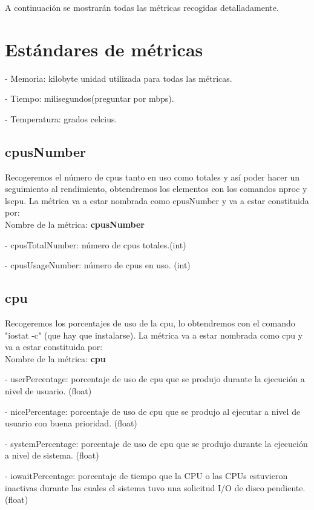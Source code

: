 \documentclass[ spanish, a4paper, 12pt, oneside]{report}
\begin{document}
A continuación se mostrarán todas las métricas recogidas detalladamente.\\

\section{Estándares de métricas}

\hyp{} Memoria: kilobyte unidad utilizada para todas las métricas.

\hyp{} Tiempo: milisegundos(preguntar por mbps).

\hyp{} Temperatura: grados celcius.

\subsection{cpusNumber}
Recogeremos el número de cpus tanto en uso como totales y así poder hacer un seguimiento al rendimiento, obtendremos los elementos con 
los comandos nproc y lscpu. La métrica va a estar nombrada como cpusNumber y va a estar constituida por:\\

Nombre de la métrica: \textbf{cpusNumber}

\hyp{} cpusTotalNumber: número de cpus totales.(int)

\hyp{} cpusUsageNumber: número de cpus en uso. (int)

\subsection{cpu}
Recogeremos los porcentajes de uso de la cpu, lo obtendremos con el comando "iostat -c" (que hay que instalarse). 
La métrica va a estar nombrada como cpu y va a estar constituida por:\\

Nombre de la métrica: \textbf{cpu}

\hyp{} userPercentage: porcentaje de uso de cpu que se produjo durante la ejecución a nivel de usuario. (float)

\hyp{} nicePercentage: porcentaje de uso de cpu que se produjo al ejecutar a nivel de usuario con buena prioridad. (float)

\hyp{} systemPercentage: porcentaje de uso de cpu que se produjo durante la ejecución a nivel de sistema. (float) 

\hyp{} iowaitPercentage: porcentaje de tiempo que la CPU o las CPUs estuvieron inactivas durante las cuales el sistema tuvo una solicitud I/O de disco pendiente. (float)
\end{document}
